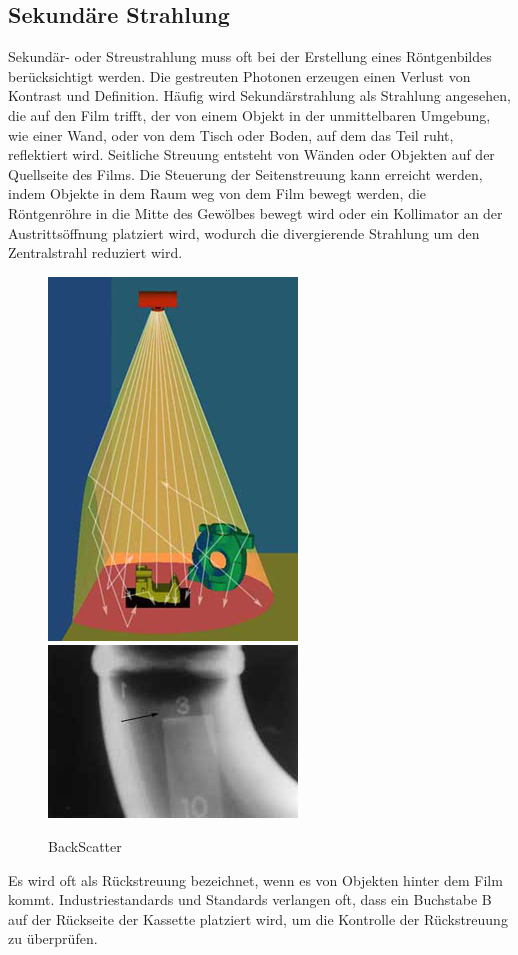 \subsection{Sekundäre Strahlung}
Sekundär- oder Streustrahlung muss oft bei der Erstellung eines Röntgenbildes berücksichtigt werden. Die gestreuten Photonen erzeugen einen Verlust von Kontrast und Definition. Häufig wird Sekundärstrahlung als Strahlung angesehen, die auf den Film trifft, der von einem Objekt in der unmittelbaren Umgebung, wie einer Wand, oder von dem Tisch oder Boden, auf dem das Teil ruht, reflektiert wird. Seitliche Streuung entsteht von Wänden oder Objekten auf der Quellseite des Films. Die Steuerung der Seitenstreuung kann erreicht werden, indem Objekte in dem Raum weg von dem Film bewegt werden, die Röntgenröhre in die Mitte des Gewölbes bewegt wird oder ein Kollimator an der Austrittsöffnung platziert wird, wodurch die divergierende Strahlung um den Zentralstrahl reduziert wird.
\begin{figure}[htb]
 \includegraphics[scale=0.7]{img/XRSIM-Scatter2aS.jpg}
 \includegraphics[scale=0.9]{img/BackScatter(small).jpg}
 \caption{BackScatter}
  \label{fig:BackScatter}
\end{figure}
Es wird oft als Rückstreuung bezeichnet, wenn es von Objekten hinter dem Film kommt. Industriestandards und Standards verlangen oft, dass ein Buchstabe B auf der Rückseite der Kassette platziert wird, um die Kontrolle der Rückstreuung zu überprüfen.

